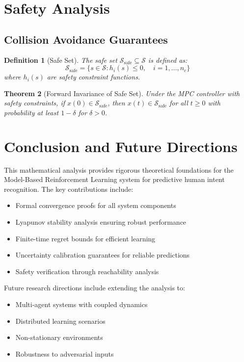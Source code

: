 \documentclass[11pt,twoside]{article}
\newtheorem{theorem}{Theorem}[section]
\newtheorem{definition}[theorem]{Definition}
\begin{document}
\section{Safety Analysis}

\subsection{Collision Avoidance Guarantees}

\begin{definition}[Safe Set]
The safe set $\mathcal{S}_{\text{safe}} \subseteq \mathcal{S}$ is defined as:
$$\mathcal{S}_{\text{safe}} = \{s \in \mathcal{S} : h_i(s) \leq 0, \quad i = 1, \ldots, n_c\}$$
where $h_i(s)$ are safety constraint functions.
\end{definition}

\begin{theorem}[Forward Invariance of Safe Set]
Under the MPC controller with safety constraints, if $x(0) \in \mathcal{S}_{\text{safe}}$, then $x(t) \in \mathcal{S}_{\text{safe}}$ for all $t \geq 0$ with probability at least $1 - \delta$ for $\delta > 0$.
\end{theorem}

\section{Conclusion and Future Directions}

This mathematical analysis provides rigorous theoretical foundations for the Model-Based Reinforcement Learning system for predictive human intent recognition. The key contributions include:

\begin{itemize}
    \item Formal convergence proofs for all system components
    \item Lyapunov stability analysis ensuring robust performance
    \item Finite-time regret bounds for efficient learning
    \item Uncertainty calibration guarantees for reliable predictions
    \item Safety verification through reachability analysis
\end{itemize}

Future research directions include extending the analysis to:
\begin{itemize}
    \item Multi-agent systems with coupled dynamics
    \item Distributed learning scenarios
    \item Non-stationary environments
    \item Robustness to adversarial inputs
\end{itemize}
\end{document}
